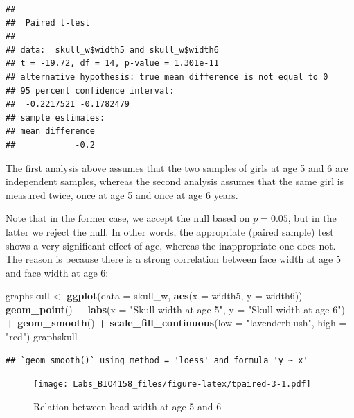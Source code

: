 \documentclass[
  12pt,
]{book}
\newenvironment{Shaded}{\begin{snugshade}}{\end{snugshade}}
\newcommand{\DataTypeTok}[1]{\textcolor[rgb]{0.13,0.29,0.53}{#1}}
\newcommand{\KeywordTok}[1]{\textcolor[rgb]{0.13,0.29,0.53}{\textbf{#1}}}
\newcommand{\NormalTok}[1]{#1}
\newcommand{\OperatorTok}[1]{\textcolor[rgb]{0.81,0.36,0.00}{\textbf{#1}}}
\newcommand{\StringTok}[1]{\textcolor[rgb]{0.31,0.60,0.02}{#1}}
\begin{document}
\begin{verbatim}
## 
##  Paired t-test
## 
## data:  skull_w$width5 and skull_w$width6
## t = -19.72, df = 14, p-value = 1.301e-11
## alternative hypothesis: true mean difference is not equal to 0
## 95 percent confidence interval:
##  -0.2217521 -0.1782479
## sample estimates:
## mean difference 
##            -0.2
\end{verbatim}

The first analysis above assumes that the two samples of girls at age 5 and 6 are independent samples, whereas the second analysis assumes that the same girl is measured twice, once at age 5 and once at age 6 years.

Note that in the former case, we accept the null based on \(p = 0.05\), but in the latter we reject the null. In other words, the appropriate (paired sample) test shows a very significant effect of age, whereas the inappropriate one does not. The reason is because there is a strong correlation between face width at age 5 and face width at age 6:

\begin{Shaded}
\begin{Highlighting}[]
\NormalTok{graphskull \textless{}{-}}\StringTok{ }\KeywordTok{ggplot}\NormalTok{(}\DataTypeTok{data =}\NormalTok{ skull\_w, }\KeywordTok{aes}\NormalTok{(}\DataTypeTok{x =}\NormalTok{ width5, }\DataTypeTok{y =}\NormalTok{ width6)) }\OperatorTok{+}
\StringTok{  }\KeywordTok{geom\_point}\NormalTok{() }\OperatorTok{+}
\StringTok{  }\KeywordTok{labs}\NormalTok{(}\DataTypeTok{x =} \StringTok{"Skull width at age 5"}\NormalTok{, }\DataTypeTok{y =} \StringTok{"Skull width at age 6"}\NormalTok{) }\OperatorTok{+}
\StringTok{  }\KeywordTok{geom\_smooth}\NormalTok{() }\OperatorTok{+}
\StringTok{  }\KeywordTok{scale\_fill\_continuous}\NormalTok{(}\DataTypeTok{low =} \StringTok{"lavenderblush"}\NormalTok{, }\DataTypeTok{high =} \StringTok{"red"}\NormalTok{)}
\NormalTok{graphskull}
\end{Highlighting}
\end{Shaded}

\begin{verbatim}
## `geom_smooth()` using method = 'loess' and formula 'y ~ x'
\end{verbatim}

\begin{figure}
\centering
\texttt{[image: Labs\_BIO4158\_files/figure-latex/tpaired-3-1.pdf]}
\caption{\label{fig:tpaired-3}Relation between head width at age 5 and 6}
\end{figure}
\end{document}
